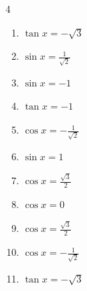 \begin{multicols}{4}
\begin{enumerate}
  \item $\displaystyle \tan{x}  = -\sqrt{3}$


  \item $\displaystyle \sin{x}  = \frac{1}{\sqrt{2}}$


  \item $\displaystyle \sin{x}  = -1$


  \item $\displaystyle \tan{x}  = -1$


  \item $\displaystyle \cos{x}  = -\frac{1}{\sqrt{2}}$


  \item $\displaystyle \sin{x}  = 1$


  \item $\displaystyle \cos{x}  = \frac{\sqrt{3}}{2}$


  \item $\displaystyle \cos{x}  = 0$


  \item $\displaystyle \cos{x}  = \frac{\sqrt{3}}{2}$


\columnbreak %

  \item $\displaystyle \cos{x}  = -\frac{1}{\sqrt{2}}$


  \item $\displaystyle \tan{x}  = -\sqrt{3}$



\end{enumerate}
\end{multicols}
